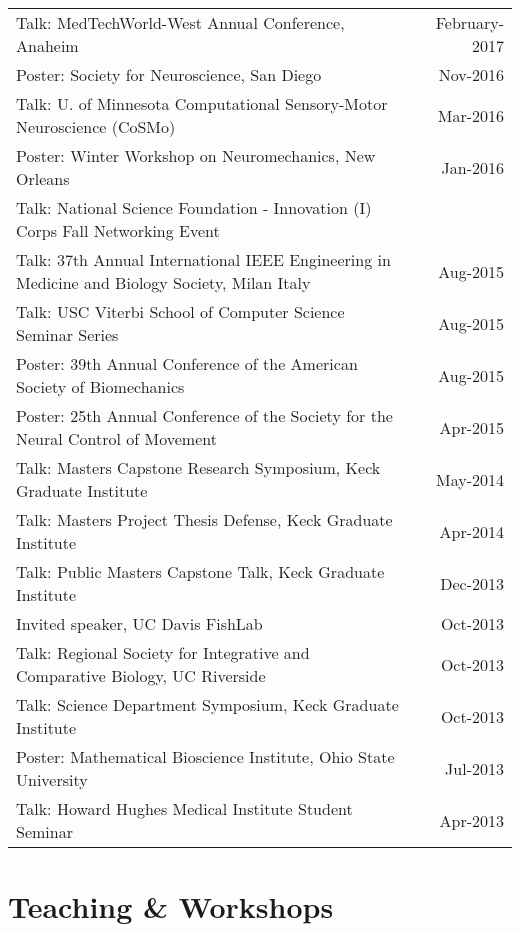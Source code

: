 \documentclass[10pt,a4paper]{article}
\begin{document}
  \vspace*{1mm}\noindent\begin{tabularx}{17cm}{X r}
    Talk: MedTechWorld-West Annual Conference, Anaheim & February-2017\\
    Poster: Society for Neuroscience, San Diego & Nov-2016 \\ 
    Talk: U. of Minnesota Computational Sensory-Motor Neuroscience (CoSMo)& Mar-2016 \\
    Poster: Winter Workshop on Neuromechanics, New Orleans & Jan-2016 \\ %
    Talk: National Science Foundation - Innovation (I) Corps Fall Networking Event \\
    Talk: 37th Annual International IEEE Engineering in Medicine and Biology Society, Milan Italy & Aug-2015 \\
    Talk: USC Viterbi School of Computer Science Seminar Series & Aug-2015 \\
    Poster: 39th Annual Conference of the American Society of Biomechanics & Aug-2015 \\
    Poster: 25th Annual Conference of the Society for the Neural Control of Movement & Apr-2015 \\
    Talk: Masters Capstone Research Symposium, Keck Graduate Institute & May-2014 \\
    Talk: Masters Project Thesis Defense, Keck Graduate Institute & Apr-2014 \\
    Talk: Public Masters Capstone Talk, Keck Graduate Institute & Dec-2013 \\
    Invited speaker, UC Davis FishLab & Oct-2013 \\
    Talk: Regional Society for Integrative and Comparative Biology, UC Riverside & Oct-2013 \\
    Talk: Science Department Symposium, Keck Graduate Institute & Oct-2013 \\
    Poster: Mathematical Bioscience Institute, Ohio State University & Jul-2013\\
    Talk: Howard Hughes Medical Institute Student Seminar & Apr-2013 \\
  \end{tabularx}

  \vspace*{2mm}\section*{Teaching \& Workshops}
\end{document}
